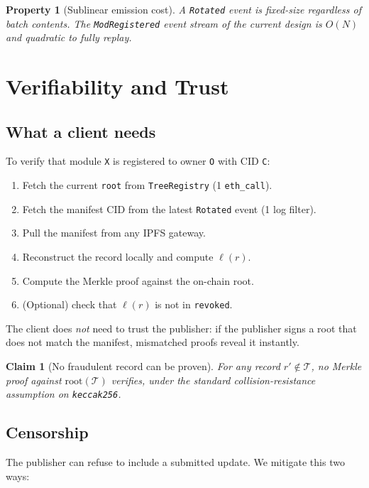 \documentclass[11pt,a4paper]{article}
\newtheorem{property}{Property}[section]
\newtheorem{claim}{Claim}[section]
\begin{document}
\begin{property}[Sublinear emission cost]
A \texttt{Rotated} event is fixed-size regardless of batch contents. The \texttt{ModRegistered} event stream of the current design is $O(N)$ and quadratic to fully replay.
\end{property}

\section{Verifiability and Trust}

\subsection{What a client needs}

To verify that module \texttt{X} is registered to owner \texttt{O} with CID \texttt{C}:

\begin{enumerate}
    \item Fetch the current \texttt{root} from \texttt{TreeRegistry} (1 \texttt{eth\_call}).
    \item Fetch the manifest CID from the latest \texttt{Rotated} event (1 log filter).
    \item Pull the manifest from any IPFS gateway.
    \item Reconstruct the record locally and compute $\ell(r)$.
    \item Compute the Merkle proof against the on-chain root.
    \item (Optional) check that $\ell(r)$ is not in \texttt{revoked}.
\end{enumerate}

The client does \emph{not} need to trust the publisher: if the publisher signs a root that does not match the manifest, mismatched proofs reveal it instantly.

\begin{claim}[No fraudulent record can be proven]
\label{claim:no-fraud}
For any record $r' \notin \mathcal{T}$, no Merkle proof against $\mathrm{root}(\mathcal{T})$ verifies, under the standard collision-resistance assumption on \texttt{keccak256}.
\end{claim}

\subsection{Censorship}

The publisher can refuse to include a submitted update. We mitigate this two ways:
\end{document}
